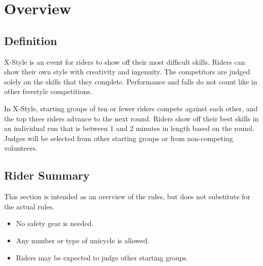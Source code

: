 \chapter{Overview}

\section{Definition}

X-Style is an event for riders to show off their most difficult skills.
Riders can show their own style with creativity and ingenuity.
The competitors are judged solely on the skills that they complete.
Performance and falls do not count like in other freestyle competitions.

In X-Style, starting groups of ten or fewer riders compete against each other, and the top three riders advance to the next round.
Riders show off their best skills in an individual run that is between 1 and 2 minutes in length based on the round.
Judges will be selected from other starting groups or from non-competing volunteers.

\section{Rider Summary}

This section is intended as an overview of the rules, but does not substitute for the actual rules.
\begin{itemize}
\item No safety gear is needed.
\item Any number or type of unicycle is allowed.
\item Riders may be expected to judge other starting groups.
\end{itemize}
